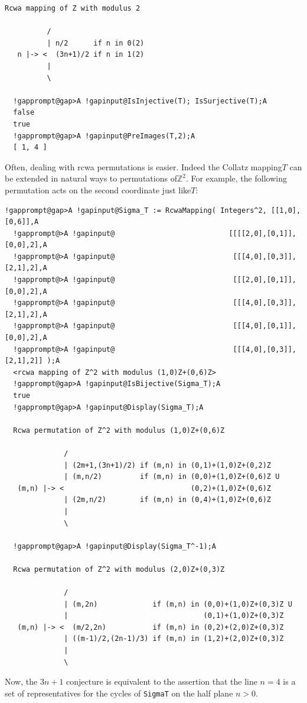 \documentclass[a4paper,11pt]{report}
\begin{document}
{{\begin{Verbatim}[commandchars=!@A,fontsize=\small,frame=single,label=Example]
  Rcwa mapping of Z with modulus 2
  
          /
          | n/2      if n in 0(2)
   n |-> <  (3n+1)/2 if n in 1(2)
          |
          \
  
  !gapprompt@gap>A !gapinput@IsInjective(T); IsSurjective(T);A
  false
  true
  !gapprompt@gap>A !gapinput@PreImages(T,2);A
  [ 1, 4 ]
\end{Verbatim}
 Often, dealing with rcwa permutations is easier. Indeed the Collatz
mapping{\nobreakspace}$T$ can be extended in natural ways to permutations of{\nobreakspace}${\ensuremath{\mathbb Z}}^2$. For example, the following permutation acts on the second coordinate just
like{\nobreakspace}$T$: 
\begin{Verbatim}[commandchars=!@A,fontsize=\small,frame=single,label=Example]
  !gapprompt@gap>A !gapinput@Sigma_T := RcwaMapping( Integers^2, [[1,0],[0,6]],A
  !gapprompt@>A !gapinput@                           [[[[2,0],[0,1]],[0,0],2],A
  !gapprompt@>A !gapinput@                            [[[4,0],[0,3]],[2,1],2],A
  !gapprompt@>A !gapinput@                            [[[2,0],[0,1]],[0,0],2],A
  !gapprompt@>A !gapinput@                            [[[4,0],[0,3]],[2,1],2],A
  !gapprompt@>A !gapinput@                            [[[4,0],[0,1]],[0,0],2],A
  !gapprompt@>A !gapinput@                            [[[4,0],[0,3]],[2,1],2]] );A
  <rcwa mapping of Z^2 with modulus (1,0)Z+(0,6)Z>
  !gapprompt@gap>A !gapinput@IsBijective(Sigma_T);A
  true
  !gapprompt@gap>A !gapinput@Display(Sigma_T);A
  
  Rcwa permutation of Z^2 with modulus (1,0)Z+(0,6)Z
  
              /
              | (2m+1,(3n+1)/2) if (m,n) in (0,1)+(1,0)Z+(0,2)Z
              | (m,n/2)         if (m,n) in (0,0)+(1,0)Z+(0,6)Z U 
   (m,n) |-> <                              (0,2)+(1,0)Z+(0,6)Z
              | (2m,n/2)        if (m,n) in (0,4)+(1,0)Z+(0,6)Z
              |
              \
  
  !gapprompt@gap>A !gapinput@Display(Sigma_T^-1);A
  
  Rcwa permutation of Z^2 with modulus (2,0)Z+(0,3)Z
  
              /
              | (m,2n)             if (m,n) in (0,0)+(1,0)Z+(0,3)Z U 
              |                                (0,1)+(1,0)Z+(0,3)Z
   (m,n) |-> <  (m/2,2n)           if (m,n) in (0,2)+(2,0)Z+(0,3)Z
              | ((m-1)/2,(2n-1)/3) if (m,n) in (1,2)+(2,0)Z+(0,3)Z
              |
              \
\end{Verbatim}
 Now, the $3n+1$ conjecture is equivalent to the assertion that the line $n=4$ is a set of representatives for the cycles of \texttt{Sigma{\textunderscore}T} on the half plane $n > 0$. 

}}
\end{document}
